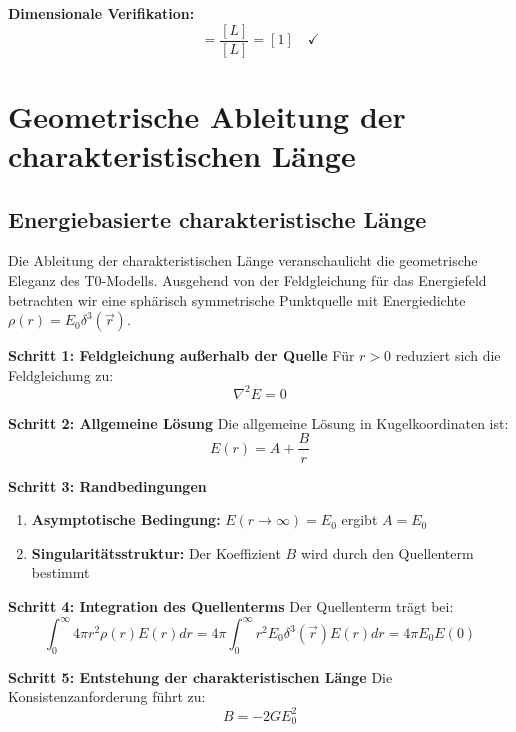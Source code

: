 \documentclass[12pt,a4paper]{report}
\begin{document}
	\textbf{Dimensionale Verifikation:}
	\begin{equation}
		[\xi] = \frac{[L]}{[L]} = [1] \quad \checkmark
	\end{equation}
	
	\section{Geometrische Ableitung der charakteristischen Länge}\label{sec:geometric_derivation}
	
	\subsection{Energiebasierte charakteristische Länge}\label{subsec:energy_based_length}
	
	Die Ableitung der charakteristischen Länge veranschaulicht die geometrische Eleganz des T0-Modells. Ausgehend von der Feldgleichung für das Energiefeld betrachten wir eine sphärisch symmetrische Punktquelle mit Energiedichte $\rho(r) = E_0 \delta^3(\vec{r})$.
	
	\textbf{Schritt 1: Feldgleichung außerhalb der Quelle}
	Für $r > 0$ reduziert sich die Feldgleichung zu:
	\begin{equation}
		\nabla^2 E = 0
		\label{eq:laplace_outside}
	\end{equation}
	
	\textbf{Schritt 2: Allgemeine Lösung}
	Die allgemeine Lösung in Kugelkoordinaten ist:
	\begin{equation}
		E(r) = A + \frac{B}{r}
		\label{eq:general_solution}
	\end{equation}
	
	\textbf{Schritt 3: Randbedingungen}
	\begin{enumerate}
		\item \textbf{Asymptotische Bedingung:} $E(r \to \infty) = E_0$ ergibt $A = E_0$
		\item \textbf{Singularitätsstruktur:} Der Koeffizient $B$ wird durch den Quellenterm bestimmt
	\end{enumerate}
	
	\textbf{Schritt 4: Integration des Quellenterms}
	Der Quellenterm trägt bei:
	\begin{equation}
		\int_0^{\infty} 4\pi r^2 \rho(r) E(r) dr = 4\pi \int_0^{\infty} r^2 E_0 \delta^3(\vec{r}) E(r) dr = 4\pi E_0 E(0)
	\end{equation}
	
	\textbf{Schritt 5: Entstehung der charakteristischen Länge}
	Die Konsistenzanforderung führt zu:
	\begin{equation}
		B = -2GE_0^2
	\end{equation}
	
\end{document}
